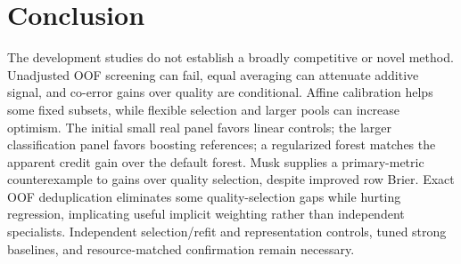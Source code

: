 \section{Conclusion}
The development studies do not establish a broadly competitive or novel method.
Unadjusted OOF screening can fail, equal averaging can attenuate additive signal,
and co-error gains over quality are conditional. Affine calibration helps some
fixed subsets, while flexible selection and larger pools can increase optimism.
The initial small real panel favors linear controls; the larger classification
panel favors boosting references; a regularized forest matches the apparent
credit gain over the default forest. Musk supplies a primary-metric counterexample
to gains over quality selection, despite improved row Brier.
Exact OOF deduplication
eliminates some quality-selection gaps while hurting regression, implicating
useful implicit weighting rather than independent specialists. Independent
selection/refit and representation controls, tuned strong baselines, and
resource-matched confirmation remain necessary.
